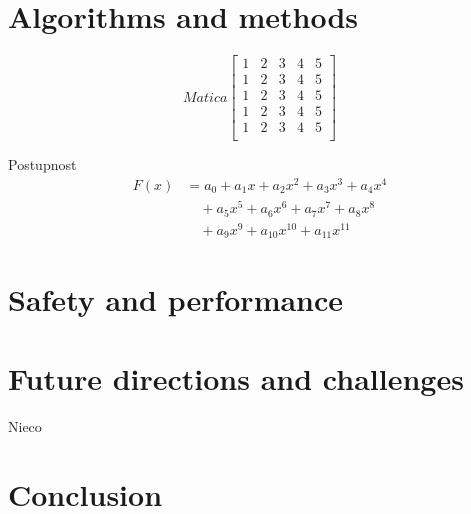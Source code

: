 \documentclass[10pt,oneside,english,a4paper]{article}
\begin{document}
\section{Algorithms and methods} \label{dolezita}



\[Matica
\begin{bmatrix}
1 & 2 & 3 & 4 & 5\\
1 & 2 & 3 & 4 & 5\\
1 & 2 & 3 & 4 & 5\\
1 & 2 & 3 & 4 & 5\\
1 & 2 & 3 & 4 & 5\\
\end{bmatrix}
\]

Postupnost
\begin{align}
    F(x) &= a_0 + a_1 x + a_2 x^2 + a_3 x^3 + a_4 x^4 \nonumber \\
         &\quad + a_5 x^5 + a_6 x^6 + a_7 x^7 + a_8 x^8 \nonumber \\
         &\quad + a_9 x^9 + a_{10} x^{10} + a_{11} x^{11} \nonumber
\end{align}

\section{Safety and performance} \label{dolezitejsia}




\section{Future directions and challenges} \label{dolezitejsia}

Nieco \cite{8501581}
\cite{8457076}
\cite{9214125}
\cite{Khayyam2020}
\cite{8679433}
\cite{8809661}
\cite{YOGANANDHAN20203303}
\cite{electronics12153223}
\cite{s23063335}
\cite{9288755}


\section{Conclusion} \label{zaver} %





\newpage

\end{document}
